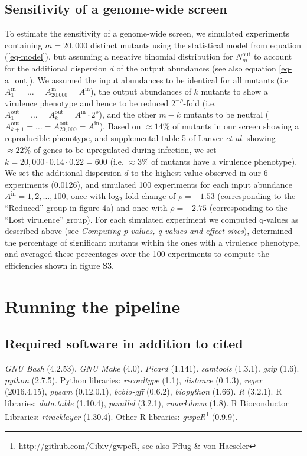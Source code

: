 \documentclass[a4paper,11pt,oneside]{amsart}
\begin{document}
\subsection*{Sensitivity of a genome-wide screen}

To estimate the sensitivity of a genome-wide screen, we simulated experiments containing $m=20,000$ distinct mutants using the statistical model from equation (\ref{eq-model}), but assuming a negative binomial distribution for $N^\text{out}_m$ to account for the additional dispersion $d$ of the output abundances (see also equation \ref{eq-a_out}). We assumed the input abundances to be identical for all mutants (i.e $A^\text{in}_1=\ldots=A^\text{in}_{20.000}=A^\text{in}$), the output abundances of $k$ mutants to show a virulence phenotype and hence to be reduced $2^{-\rho}$-fold (i.e. $A^\text{out}_1=\ldots=A^\text{out}_k=A^\text{in}\cdot 2^{\rho}$), and the other $m-k$ mutants to be neutral ($A^\text{out}_{k+1}=\ldots=A^\text{out}_{20,000}=A^\text{in}$). Based on $\approx 14\%$ of mutants in our screen showing a reproducible phenotype, and supplemental table 5 of Lanver \textit{et al.} \cite{Lanver2018} showing $\approx 22\%$ of genes to be upregulated during infection, we set $k=20,000\cdot 0.14\cdot0.22 =600$ (i.e. $\approx 3\%$ of mutants have a virulence phenotype). We set the additional dispersion $d$ to the highest value observed in our 6 experiments (0.0126), and simulated 100 experiments for each input abundance $A^\text{in}=1,2,\ldots,100$, once with log$_2$ fold change of $\rho=-1.53$ (corresponding to the ``Reduced'' group in figure 4a) and once with $\rho=-2.75$ (corresponding to the ``Lost virulence'' group). For each simulated experiment we computed q-values as described above (see \textit{Computing p-values, q-values and effect sizes}), determined the percentage of significant mutants within the ones with a virulence phenotype, and averaged these percentages over the 100 experiments to compute the efficiencies shown in figure S3.

\section{Running the pipeline}
\enlargethispage{1\baselineskip}

\subsection*{Required software in addition to cited}

\emph{GNU Bash} (4.2.53). \emph{GNU Make} (4.0). \emph{Picard} (1.141). \emph{samtools} (1.3.1). \emph{gzip} (1.6). \emph{python} (2.7.5). Python libraries: \emph{recordtype} (1.1), \emph{distance} (0.1.3), \emph{regex} (2016.4.15), \emph{pysam} (0.12.0.1), \emph{bcbio-gff} (0.6.2), \emph{biopython} (1.66). \emph{R} (3.2.1). R libraries: \emph{data.table} (1.10.4), \emph{parallel} (3.2.1), \emph{rmarkdown} (1.8). R Bioconductor Libraries: \emph{rtracklayer} (1.30.4). Other R libraries: \emph{gwpcR}\footnote{\url{http://github.com/Cibiv/gwpcR}, see also Pflug \& von Haeseler\cite{Pflug2017Preprint}} (0.9.9).
\end{document}
